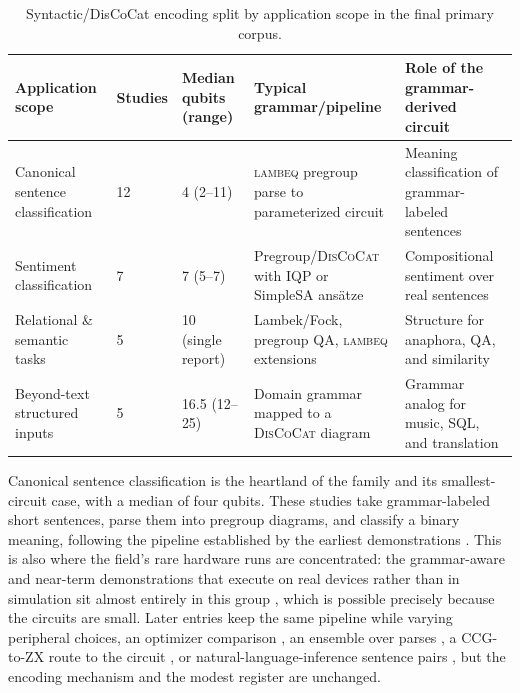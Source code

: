 \documentclass{ieeeaccess}
\begin{document}
\begin{table}[t]
\caption{Syntactic/DisCoCat encoding split by application scope in the final primary corpus.}
\label{tab:syntactic_by_application}
\centering
\scriptsize
\begin{tabular}{@{}p{} p{} p{} p{} p{}@{}}
\hline
\textbf{Application scope} & \textbf{Studies} & \textbf{Median qubits (range)} & \textbf{Typical grammar/pipeline} & \textbf{Role of the grammar-derived circuit} \\
\hline
Canonical sentence classification & 12 & 4 (2--11) & \textsc{lambeq} pregroup parse to parameterized circuit & Meaning classification of grammar-labeled sentences \\
Sentiment classification & 7 & 7 (5--7) & Pregroup/\textsc{DisCoCat} with IQP or SimpleSA ansätze & Compositional sentiment over real sentences \\
Relational \& semantic tasks & 5 & 10 (single report) & Lambek/Fock, pregroup QA, \textsc{lambeq} extensions & Structure for anaphora, QA, and similarity \\
Beyond-text structured inputs & 5 & 16.5 (12--25) & Domain grammar mapped to a \textsc{DisCoCat} diagram & Grammar analog for music, SQL, and translation \\
\hline
\end{tabular}
\end{table}

Canonical sentence classification is the heartland of the family and its smallest-circuit case, with a median of four qubits. These studies take grammar-labeled short sentences, parse them into pregroup diagrams, and classify a binary meaning, following the pipeline established by the earliest demonstrations \cite{meichanetzidis_quantum_2021,kartsaklis_lambeq_2021,lorenz_qnlp_2023}. This is also where the field's rare hardware runs are concentrated: the grammar-aware and near-term demonstrations that execute on real devices rather than in simulation sit almost entirely in this group \cite{meichanetzidis_grammar-aware_2023,lorenz_qnlp_2023}, which is possible precisely because the circuits are small. Later entries keep the same pipeline while varying peripheral choices, an optimizer comparison \cite{rajashekharaiah_sentence_2023}, an ensemble over parses \cite{bouakba_ensemble_2023}, a CCG-to-ZX route to the circuit \cite{sreedhar_towards_2025}, or natural-language-inference sentence pairs \cite{sun_quantum_2026}, but the encoding mechanism and the modest register are unchanged.
\end{document}
